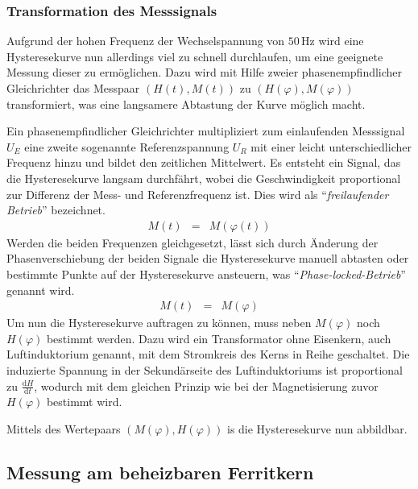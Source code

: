 \documentclass[12pt,a4paper]{scrartcl}
\numberwithin{equation}{section} %
\renewcommand{\[}{} %
\renewcommand{\]}{\noindent} %
\begin{document}
\hypertarget{transformation-des-messsignals}{%
\subsubsection{Transformation des Messsignals}\label{transformation-des-messsignals}}
Aufgrund der hohen Frequenz der Wechselspannung von \(50\,\mathrm{Hz}\) wird eine Hysteresekurve nun allerdings viel zu schnell durchlaufen, um eine geeignete Messung dieser zu ermöglichen. Dazu wird mit Hilfe zweier phasenempfindlicher Gleichrichter das Messpaar \((H(t), M(t))\) zu \((H(\varphi), M(\varphi))\) transformiert, was eine langsamere Abtastung der Kurve möglich macht.

\hypertarget{bestimmung-von-mvarphi}{\label{bestimmung-von-mvarphi}}
Ein phasenempfindlicher Gleichrichter multipliziert zum einlaufenden Messsignal \(U_E\) eine zweite sogenannte Referenzspannung \(U_R\) mit einer leicht unterschiedlicher Frequenz hinzu und bildet den zeitlichen Mittelwert. Es entsteht ein Signal, das die Hysteresekurve langsam durchfährt, wobei die Geschwindigkeit proportional zur Differenz der Mess- und Referenzfrequenz ist. Dies wird als ``\emph{freilaufender Betrieb}'' bezeichnet.
\begin{eqnarray}
    M(t) &=& M(\varphi(t))
\end{eqnarray}
Werden die beiden Frequenzen gleichgesetzt, lässt sich durch Änderung der Phasenverschiebung der beiden Signale die Hysteresekurve manuell abtasten oder bestimmte Punkte auf der Hysteresekurve ansteuern, was ``\emph{Phase-locked-Betrieb}'' genannt wird.
\begin{eqnarray}
    M(t) &=& M(\varphi)
\end{eqnarray}
\hypertarget{bestimmung-von-hvarphi}{\label{bestimmung-von-hvarphi}}Um nun die Hysteresekurve auftragen zu können, muss neben \(M(\varphi)\) noch \(H(\varphi)\) bestimmt werden. Dazu wird ein Transformator ohne Eisenkern, auch Luftinduktorium genannt, mit dem Stromkreis des Kerns in Reihe geschaltet. Die induzierte Spannung in der Sekundärseite des Luftinduktoriums ist proportional zu \(\frac{\mathrm dH}{\mathrm dt}\), wodurch mit dem gleichen Prinzip wie bei der Magnetisierung zuvor \(H(\varphi)\) bestimmt wird.

Mittels des Wertepaars \((M(\varphi), H(\varphi))\) is die Hysteresekurve nun abbildbar.

\hypertarget{messung-am-beheizbaren-ferritkern}{%
\subsection{Messung am beheizbaren Ferritkern}\label{messung-am-beheizbaren-ferritkern}}
\end{document}

